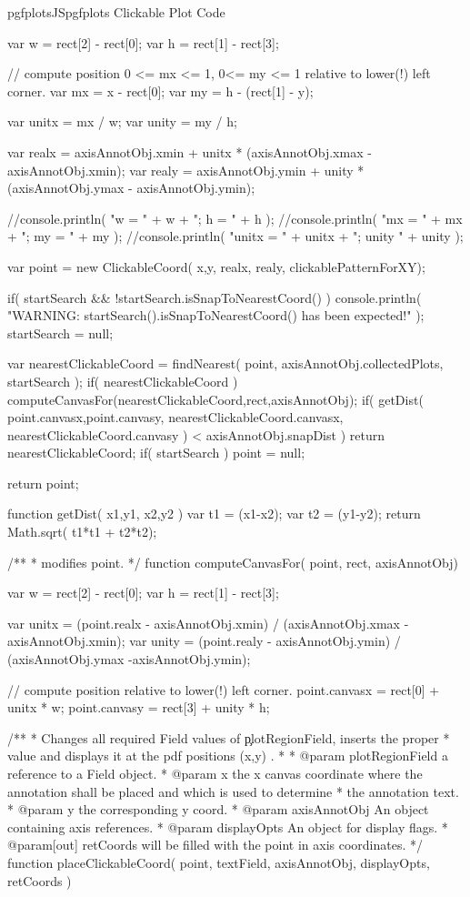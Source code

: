 {{\begin{insDLJS}[processAnnotatedPlot]{pgfplotsJS}{pgfplots Clickable Plot Code}
{	var w = rect[2] - rect[0];
	var h = rect[1] - rect[3];

	// compute position 0 <= mx <= 1, 0<= my <= 1 relative to lower(!) left corner.
	var mx = x - rect[0];
	var my = h - (rect[1] - y);

	var unitx = mx / w;
	var unity = my / h;

	var realx = axisAnnotObj.xmin + unitx * (axisAnnotObj.xmax - axisAnnotObj.xmin);
	var realy = axisAnnotObj.ymin + unity * (axisAnnotObj.ymax - axisAnnotObj.ymin);

	//console.println( "w = " + w + "; h = " + h );
	//console.println( "mx = " + mx + "; my = " + my );
	//console.println( "unitx = " + unitx + "; unity " + unity );

	var point = new ClickableCoord( x,y, realx, realy, clickablePatternForXY);

	if( startSearch && !startSearch.isSnapToNearestCoord() ) {
		console.println( "WARNING: startSearch().isSnapToNearestCoord() has been expected!" );
		startSearch = null;
	}
	
	var nearestClickableCoord = findNearest( point, axisAnnotObj.collectedPlots, startSearch );
	if( nearestClickableCoord ) {
		computeCanvasFor(nearestClickableCoord,rect,axisAnnotObj);
		if( getDist( point.canvasx,point.canvasy,  nearestClickableCoord.canvasx, nearestClickableCoord.canvasy ) < axisAnnotObj.snapDist ) {
			return nearestClickableCoord;
		}
	}
	if( startSearch ) {
		point = null;
	}

	return point;
}

function getDist( x1,y1, x2,y2 ) {
	var t1 = (x1-x2);
	var t2 = (y1-y2);
	return Math.sqrt( t1*t1 + t2*t2);
}

/**
 * modifies point.
 */
function computeCanvasFor( point, rect, axisAnnotObj)
{
	var w = rect[2] - rect[0];
	var h = rect[1] - rect[3];


	var unitx = (point.realx - axisAnnotObj.xmin) / (axisAnnotObj.xmax -axisAnnotObj.xmin);
	var unity = (point.realy - axisAnnotObj.ymin) / (axisAnnotObj.ymax -axisAnnotObj.ymin);

	// compute position relative to lower(!) left corner.
	point.canvasx = rect[0] + unitx * w;
	point.canvasy = rect[3] + unity * h;
}
/**
 * Changes all required Field values of \c plotRegionField, inserts the proper
 * value and displays it at the pdf positions (x,y) .
 *
 * @param plotRegionField a reference to a Field object.
 * @param x the x canvas coordinate where the annotation shall be placed and which is used to determine
 *  the annotation text.
 * @param y the corresponding y coord.
 * @param axisAnnotObj An object containing axis references.
 * @param displayOpts An object for display flags.
 * @param[out] retCoords will be filled with the point in axis coordinates.
 */
function placeClickableCoord( point, textField, axisAnnotObj, displayOpts, retCoords )
{

}
\end{insDLJS}}}
